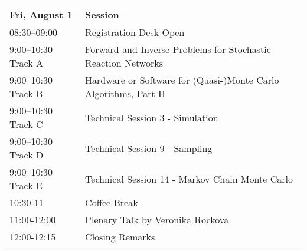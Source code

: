 \begin{table}
\begin{tabularx}{\textwidth}{>{\hsize=0.5\hsize}X|>{\hsize=1.5\hsize}X}
\hline
\textbf{Fri, August 1} & \textbf{Session} \\
\hline
\cellcolor{\EmptyColor}08:30–09:00 & \cellcolor{\EmptyColor}Registration Desk Open \\
\cellcolor{\SessionTitleColor}9:00–10:30 Track A & \cellcolor{\SessionTitleColor}Forward and Inverse Problems for Stochastic Reaction Networks \\
\cellcolor{\SessionTitleColor}9:00–10:30 Track B & \cellcolor{\SessionTitleColor}Hardware or Software for (Quasi-)Monte Carlo Algorithms, Part II \\
\cellcolor{\SessionLightColor}9:00–10:30 Track C & \cellcolor{\SessionLightColor}Technical Session 3 - Simulation \\
\cellcolor{\SessionLightColor}9:00–10:30 Track D & \cellcolor{\SessionLightColor}Technical Session 9 - Sampling \\
\cellcolor{\SessionLightColor}9:00–10:30 Track E & \cellcolor{\SessionLightColor}Technical Session 14 - Markov Chain Monte Carlo \\
\cellcolor{\EmptyColor}10:30-11 & \cellcolor{\EmptyColor}Coffee Break \\
\cellcolor{\PlenaryColor}11:00-12:00 & \cellcolor{\PlenaryColor}Plenary Talk by Veronika Rockova \\
\cellcolor{\EmptyColor}12:00-12:15 & \cellcolor{\EmptyColor}Closing Remarks \\
\hline
\end{tabularx}
\end{table}

